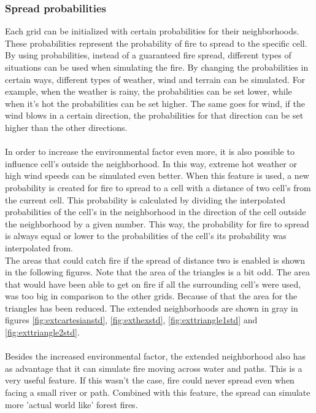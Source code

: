 \documentclass{article}
\begin{document}
\begin{multicols}{2}
\subsubsection*{Spread probabilities}
Each grid can be initialized with certain probabilities for their neighborhoods. These probabilities represent the probability of fire to spread to the specific cell. By using probabilities, instead of a guaranteed fire spread, different types of situations can be used when simulating the fire. By changing the probabilities in certain ways, different types of weather, wind and terrain can be simulated. For example, when the weather is rainy, the probabilities can be set lower, while when it’s hot the probabilities can be set higher. The same goes for wind, if the wind blows in a certain direction, the probabilities for that direction can be set higher than the other directions.\\\\
In order to increase the environmental factor even more, it is also possible to influence cell's outside the neighborhood. In this way, extreme hot weather or high wind speeds can be simulated even better. When this feature is used, a new probability is created for fire to spread to a cell with a distance of two cell's from the current cell. This probability is calculated by dividing the interpolated probabilities of the cell's in the neighborhood in the direction of the cell outside the neighborhood by a given number. This way, the probability for fire to spread is always equal or lower to the probabilities of the cell's its probability was interpolated from.\\
The areas that could catch fire if the spread of distance two is enabled is shown in the following figures. Note that the area of the triangles is a bit odd. The area that would have been able to get on fire if all the surrounding cell's were used, was too big in comparison to the other grids. Because of that the area for the triangles has been reduced. The extended neighborhoods are shown in gray in figures \ref{fig:extcartesianstd},  \ref{fig:exthexstd},  \ref{fig:exttriangle1std} and  \ref{fig:exttriangle2std}.\\\\
Besides the increased environmental factor, the extended neighborhood also has as advantage that it can simulate fire moving across water and paths. This is a very useful feature. If this wasn't the case, fire could never spread even when facing a small river or path. Combined with this feature, the spread can simulate more 'actual world like' forest fires.

\end{multicols}
\end{document}

